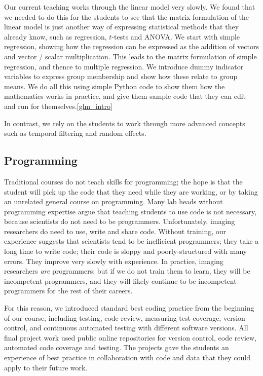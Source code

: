 Our current teaching works through the linear model very slowly. We found that
we needed to do this for the students to see that the matrix formulation of
the linear model is just another way of expressing statistical methods that
they already know, such as regression, $t$-tests and ANOVA.  We start with
simple regression, showing how the regression can be expressed as the addition
of vectors and vector / scalar multiplication.  This leads to the matrix
formulation of simple regression, and thence to multiple regression.  We
introduce dummy indicator variables to express group membership and show how
these relate to group means.  We do all this using simple Python code to show
them how the mathematics works in practice, and give them sample code that
they can edit and run for themselves.\cref{glm_intro}

In contrast, we rely on the students to work through more advanced concepts
such as temporal filtering and random effects.

\subsection{Programming}

Traditional courses do not teach skills for programming; the hope is that the
student will pick up the code that they need while they are working, or by
taking an unrelated general course on programming.  Many lab heads without
programming expertise argue that teaching students to use code is not
necessary, because scientists do not need to be programmers.  Unfortunately,
imaging researchers do need to use, write and share code.  Without training,
our experience suggests that scientists tend to be inefficient programmers;
they take a long time to write code; their code is sloppy and
poorly-structured with many errors.  They improve very slowly with experience.
In practice, imaging researchers {\em are} programmers; but if we do not train
them to learn, they will be incompetent programmers, and they will likely
continue to be incompetent programmers for the rest of their careers.

For this reason, we introduced standard best coding practice from the
beginning of our course, including testing, code review, measuring test
coverage, version control, and continuous automated testing with different
software versions. All final project work used public online repositories for
version control, code review, automated code coverage and testing.  The
projects gave the students an experience of best practice in collaboration
with code and data that they could apply to their future work.

